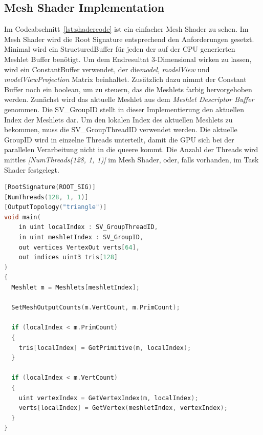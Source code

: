 \subsection{Mesh Shader Implementation}
\label{subsec:mesh_shader_impl}
Im Codeabschnitt~\ref{lst:shadercode} ist ein einfacher Mesh Shader zu sehen.
Im Mesh Shader wird die Root Signature entsprechend den Anforderungen gesetzt.
Minimal wird ein StructuredBuffer für jeden der auf der CPU generierten Meshlet Buffer benötigt.
Um dem Endresultat 3-Dimensional wirken zu lassen, wird ein ConstantBuffer verwendet, der die\textit{model}, \textit{modelView} und \textit{modelViewProjection} Matrix beinhaltet. 
Zusätzlich dazu nimmt der Constant Buffer noch ein boolean, um zu steuern, das die Meshlets farbig hervorgehoben werden.
Zunächst wird das aktuelle Meshlet aus dem \textit{Meshlet Descriptor Buffer} genommen.
Die SV\_GroupID stellt in dieser Implementierung den aktuellen Index der Meshlets dar.
Um den lokalen Index des aktuellen Meshlets zu bekommen, muss die SV\_GroupThreadID verwendet werden.
Die aktuelle GroupID wird in einzelne Threads unterteilt, damit die GPU sich bei der parallelen Verarbeitung nicht in die queere kommt.
Die Anzahl der Threads wird mittles \textit{[NumThreads(128, 1, 1)]} im Mesh Shader, oder, falls vorhanden, im Task Shader festgelegt.

\newpage \begin{lstlisting}[language = C++, caption = Standard Mesh Shader main-Methode, label=lst:shadercode]
[RootSignature(ROOT_SIG)]
[NumThreads(128, 1, 1)]
[OutputTopology("triangle")]
void main(
    in uint localIndex : SV_GroupThreadID,
    in uint meshletIndex : SV_GroupID,
    out vertices VertexOut verts[64],
    out indices uint3 tris[128]
)
{
  Meshlet m = Meshlets[meshletIndex];

  SetMeshOutputCounts(m.VertCount, m.PrimCount);
  
  if (localIndex < m.PrimCount)
  {
    tris[localIndex] = GetPrimitive(m, localIndex);
  }
  
  if (localIndex < m.VertCount)
  {
    uint vertexIndex = GetVertexIndex(m, localIndex);
    verts[localIndex] = GetVertex(meshletIndex, vertexIndex);
  }
}
\end{lstlisting}

